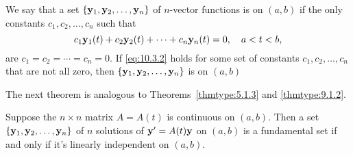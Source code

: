 \documentclass{ximera}
\begin{document}
We say that a set $\{{\bf y}_1,{\bf y}_2,\dots,{\bf y}_n\}$ of
$n$-vector functions is  on $(a,b)$ if the
only constants $c_1, c_2, \dots, c_n$ such that
\begin{equation} \label{eq:10.3.2}
 c_1{\bf y}_1(t)+c_2{\bf y}_2(t)+\cdots+c_n{\bf y}_n(t)=0,\quad
a<t<b,
\end{equation}
are $c_1=c_2=\cdots=c_n=0$. If \eqref{eq:10.3.2} holds for some set of
constants $c_1, c_2, \dots, c_n$ that are not all zero, then $\{{\bf
y}_1,{\bf y}_2,\dots,{\bf y}_n\}$ is  on
$(a,b)$

The next theorem is analogous to
Theorems~\ref{thmtype:5.1.3} and
\ref{thmtype:9.1.2}.

\begin{theorem}\label{thmtype:10.3.1}
Suppose the $n\times n$ matrix $A=A(t)$ is continuous on $(a,b)$.
Then a set
$\{{\bf y}_1,{\bf y}_2,\dots,{\bf y}_n\}$ of $n$ solutions of ${\bf
y}'=A(t){\bf y}$ on $(a,b)$ is a fundamental set if and only if it's
linearly independent on $(a,b)$.
\end{theorem}
\end{document}
